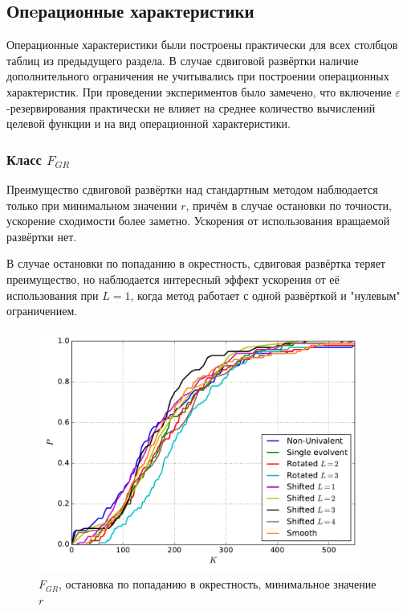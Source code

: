\documentclass[a4paper]{article}
\begin{document}
\subsection{Опeрационные характеристики}
Операционные характеристики были построены практически для всех столбцов таблиц из предыдущего раздела.
В случае сдвиговой развёртки наличие дополнительного ограничения не учитывались при построении операционных характеристик.
При проведении экспериментов было замечено, что включение $\varepsilon$-резервирования практически не влияет на среднее
количество вычислений целевой функции и на вид операционной характеристики.

\subsubsection{Класс $F_{GR}$}
Преимущество сдвиговой развёртки над стандартным методом наблюдается только при минимальном значении $r$, причём в случае остановки по точности,
ускорение сходимости более заметно. Ускорения от использования вращаемой развёртки нет.

В случае остановки по попаданию в окрестность, сдвиговая развёртка теряет преимущество, но наблюдается интересный эффект
ускорения от её использования при $L=1$, когда метод работает с одной развёрткой и "нулевым" ограничением.

\begin{figure}
  \center
  \includegraphics[width=0.95\textwidth]{../f_gr/opt_point/grish_opt_point_op.pdf}
  \caption{$F_{GR}$, остановка по попаданию в окрестность, минимальное значение $r$}
  \label{fig:}
\end{figure}
\end{document}
